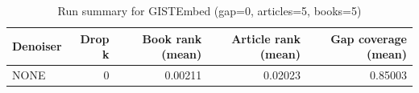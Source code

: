 \begin{table}
\caption{Run summary for GISTEmbed (gap=0, articles=5, books=5)}
\label{tab:summary_gap0_gistembed_a5_b5}
\begin{tabular}{lrrrr}
\toprule
Denoiser & Drop k & Book rank (mean) & Article rank (mean) & Gap coverage (mean) \\
\midrule
NONE & 0 & 0.00211 & 0.02023 & 0.85003 \\
\bottomrule
\end{tabular}
\end{table}